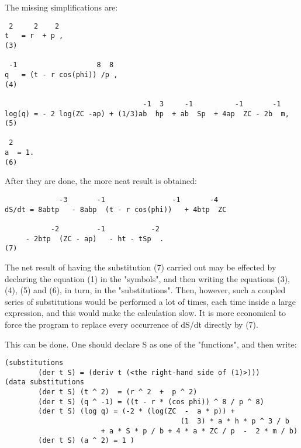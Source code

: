 \bigskip

\noindent The missing simplifications are:

\bigskip

\begin{verbatim}
 2     2    2
t   = r  + p ,                                                        (3)

 -1                   8  8
q   = (t - r cos(phi)) /p ,                                           (4)

                                 -1  3     -1          -1       -1
log(q) = - 2 log(ZC -ap) + (1/3)ab  hp  + ab  Sp  + 4ap  ZC - 2b  m,  (5)

 2
a  = 1.                                                               (6)
\end{verbatim}

\bigskip

\noindent After they are done, the more neat result is obtained:

\bigskip

\begin{verbatim}
             -3       -1                -1       -4
dS/dt = 8abtp   - 8abp  (t - r cos(phi))   + 4btp  ZC

           -2         -1           -2
     - 2btp  (ZC - ap)   - ht - tSp  .                                (7)
\end{verbatim}

\bigskip

\noindent The net result of having the substitution (7) carried out may
     be effected by declaring the equation (1) in the "symbols", and
     then writing the equations (3), (4), (5) and (6),  in  turn,
     in  the  "substitutions". Then, however, such a coupled series
     of substitutions would be performed a  lot  of  times,  each
time inside a large expression, and this would make the calculation slow. It is
more economical to force the program to
     replace every occurrence of dS/dt directly by (7).

This can be done. One should declare S as  one  of  the
     "functions", and then write:

\bigskip

\begin{verbatim}
(substitutions
        (der t S) = (deriv t (<the right-hand side of (1)>)))
(data substitutions
        (der t S) (t ^ 2)  = (r ^ 2  +  p ^ 2)
        (der t S) (q ^ -1) = ((t - r * (cos phi)) ^ 8 / p ^ 8)
        (der t S) (log q) = (-2 * (log(ZC  -  a * p)) +
                                          (1  3) * a * h * p ^ 3 / b
                       + a * S * p / b + 4 * a * ZC / p  -  2 * m / b)
        (der t S) (a ^ 2) = 1 )
\end{verbatim}

